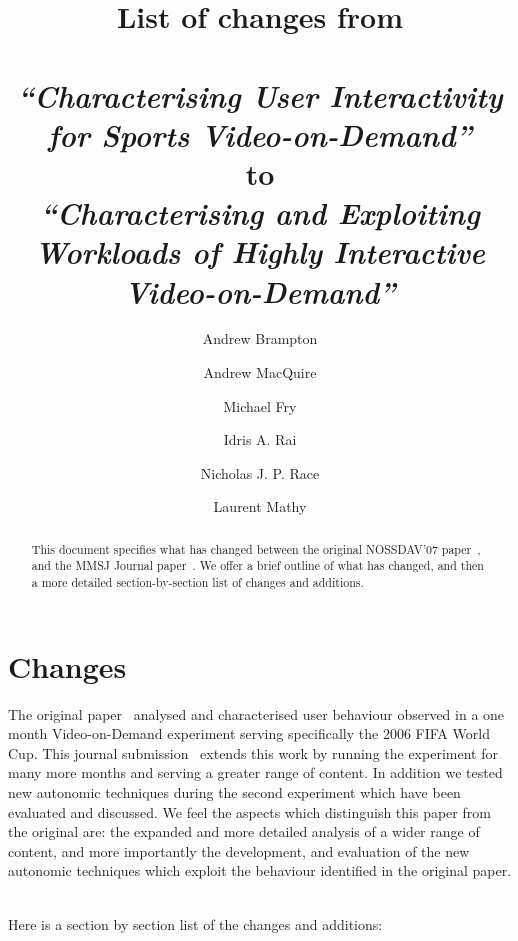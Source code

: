 \documentclass[a4paper]{article}
\author{Andrew Brampton \and Andrew MacQuire \and Michael Fry \and Idris A. Rai \and Nicholas J. P. Race \and Laurent Mathy}
\date{}
\begin{document}
\title{\Large List of changes from\\~\\\emph{``Characterising User Interactivity for Sports Video-on-Demand''}\\to\\\emph{``Characterising and Exploiting Workloads of Highly Interactive Video-on-Demand''}}
\maketitle

\begin{abstract}

This document specifies what has changed between the original NOSSDAV'07 paper~\cite{Brampton07Characterising}, and the MMSJ Journal paper~\cite{Brampton08Characterising}. We offer a brief outline of what has changed, and then a more detailed section-by-section list of changes and additions.

\end{abstract}

\section{Changes}

The original paper~\cite{Brampton07Characterising} analysed and characterised user behaviour observed in a one month Video-on-Demand experiment serving specifically the 2006 FIFA World Cup. This journal submission~\cite{Brampton08Characterising} extends this work by running the experiment for many more months and serving a greater range of content. In addition we tested new autonomic techniques during the second experiment which have been evaluated and discussed. We feel the aspects which distinguish this paper from the original are: the expanded and more detailed analysis of a wider range of content, and more importantly the development, and evaluation of the new autonomic techniques which exploit the behaviour identified in the original paper.

~\\
Here is a section by section list of the changes and additions:
\end{document}
